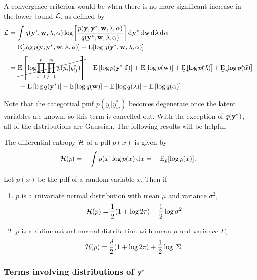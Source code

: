 A convergence criterion would be when there is no more significant increase in the lower bound $\cL$, as defined by
\begin{align*}
  \cL &= \int q(\by^*,\bw,\lambda,\alpha) \log \left[ \frac{p(\by,\by^*,\bw,\lambda,\alpha)}{q(\by^*,\bw,\lambda,\alpha)} \right] \d\by^* \d\bw \d\lambda \d\alpha \\
  &= \E[\log p(\by,\by^*,\bw,\lambda,\alpha)] - \E[\log q(\by^*,\bw,\lambda,\alpha)] \\[8pt]
  &= \cancel{\E\left[\log \prod_{i=1}^n \prod_{j=1}^m p(y_{i}|y_{ij}^*)\right]}
  + \E\left[ \log p(\by^* | \bff) \right]
  + \E\left[ \log p(\bw) \right] 
  + \cancel{\E\left[ \log p(\lambda) \right]}
  + \cancel{\E\left[ \log p(\alpha) \right]}  \\
  &\phantom{==} - \E\left[ \log q(\by^*) \right]
  - \E\left[ \log q(\bw) \right]
  - \E\left[ \log q(\lambda) \right]
  - \E\left[ \log q(\alpha) \right]
\end{align*}

Note that the categorical pmf $p(y_i|y_{ij}^*)$ becomes degenerate once the latent variables are known, so this term is cancelled out. With the exception of $q(\by^*)$, all of the distributions are Gaussian. The following results will be helpful. 

\begin{definition}
  The differential entropy $\cH$ of a pdf $p(x)$ is given by
  \[
    \cH(p) = -\int p(x) \log p(x) \d x = -\E_p[\log p(x)].
  \]
\end{definition}

\begin{lemma}\label{thm:normentropy}
  Let $p(x)$ be the pdf of a random variable $x$. Then if
  \begin{enumerate}[label=(\roman*)]
    \item $p$ is a univariate normal distribution with mean $\mu$ and variance $\sigma^2$,
    \[
      \cH(p) = \half (1 + \log 2\pi) + \half \log \sigma^2
    \]
    \item $p$ is a $d$-dimensional normal distribution with mean $\mu$ and variance $\Sigma$,
    \[
      \cH(p) = \half[d] (1 + \log 2\pi) + \half \log \vert \Sigma \vert 
    \]
  \end{enumerate}
\end{lemma}

\subsubsection{Terms involving distributions of $\by^*$}

